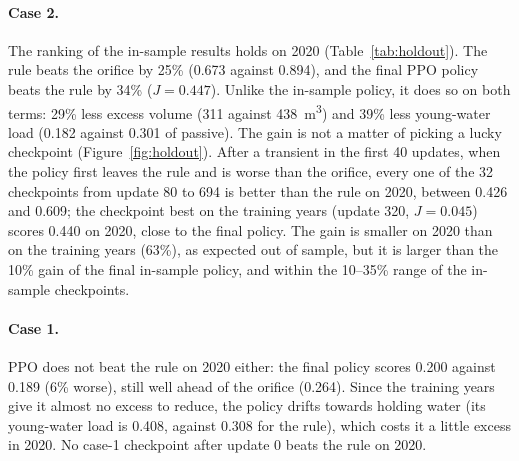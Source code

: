 \documentclass[11pt]{article}
\begin{document}
\paragraph{Case 2.} The ranking of the in-sample results holds on 2020
(Table~\ref{tab:holdout}). The rule beats the orifice by 25\% (0.673 against 0.894), and the
final PPO policy beats the rule by 34\% ($J = 0.447$). Unlike the in-sample policy, it does
so on both terms: 29\% less excess volume (311 against \SI{438}{\m^3}) and 39\% less
young-water load (0.182 against 0.301 of passive). The gain is not a matter of picking a
lucky checkpoint (Figure~\ref{fig:holdout}). After a transient in the first 40 updates, when
the policy first leaves the rule and is worse than the orifice, every one of the 32
checkpoints from update 80 to 694 is better than the rule on 2020, between 0.426 and 0.609;
the checkpoint best on the training years (update 320, $J = 0.045$) scores 0.440 on 2020,
close to the final policy. The gain is smaller on 2020 than on the training years (63\%),
as expected out of sample, but it is larger than the 10\% gain of the final in-sample
policy, and within the 10--35\% range of the in-sample checkpoints.

\paragraph{Case 1.} PPO does not beat the rule on 2020 either: the final policy scores
0.200 against 0.189 (6\% worse), still well ahead of the orifice (0.264). Since the training
years give it almost no excess to reduce, the policy drifts towards holding water (its
young-water load is 0.408, against 0.308 for the rule), which costs it a little excess in
2020. No case-1 checkpoint after update 0 beats the rule on 2020.
\end{document}
